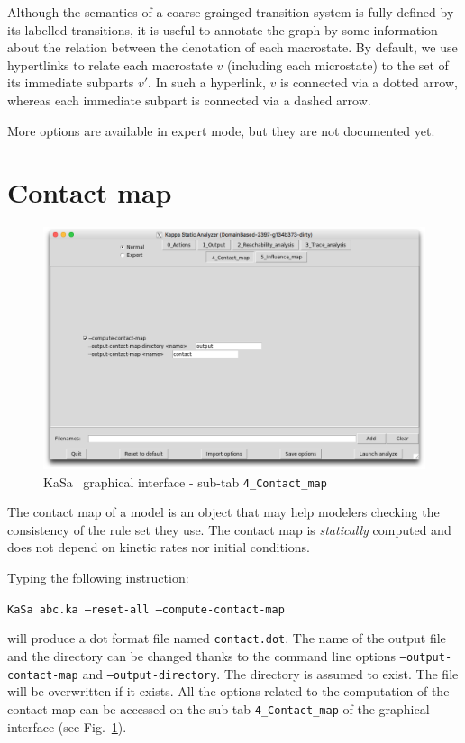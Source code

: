 \documentclass[11pt]{book}
\def\KaSa{\textsf{KaSa}}
\begin{document}
Although the semantics of a coarse-grainged transition system is fully defined  by its labelled transitions, it is useful to annotate the graph by some information about the relation between the denotation of each macrostate. By default, we use hypertlinks to relate each macrostate $v$ (including each microstate)
 to the set of its immediate subparts $v'$. In such a hyperlink, $v$ is connected via a dotted arrow, whereas each immediate subpart is connected via a dashed arrow.

 More options are available in expert mode, but they are not documented yet.

\section{Contact map}

\begin{figure}[htbp]
\centering
\includegraphics[width=12cm,bb=0 0 1904 1208]{img/kasa_4.png}
\caption{\KaSa~ graphical interface - sub-tab \texttt{4\_Contact\_map}}
\label{fig:kasa:4}
\end{figure}

The contact map of a model is an object that may help modelers checking the consistency of the rule set they use. The contact map is \emph{statically} computed and does not depend on kinetic rates nor initial conditions.


Typing the following instruction:

\texttt{KaSa abc.ka --reset-all --compute-contact-map}

will produce a dot format file named \texttt{contact.dot}.
The name of the output file and the directory can be changed thanks to the command line options \texttt{--output-contact-map} and \texttt{--output-directory}.
The directory is assumed to exist. The file will be overwritten if it exists. All the options related to the computation of the contact map can be accessed on the
sub-tab \texttt{4\_Contact\_map} of the graphical interface (see Fig.~\ref{fig:kasa:4}).
\end{document}
